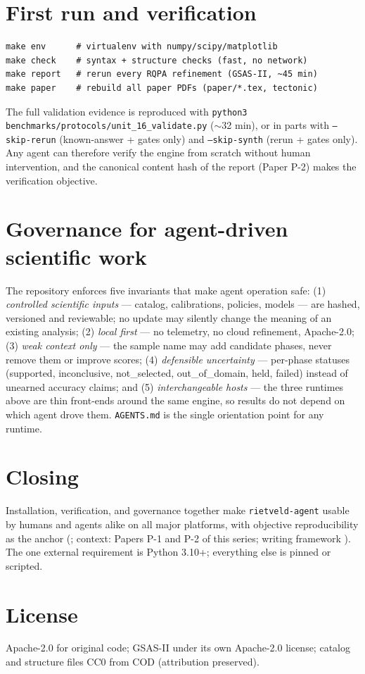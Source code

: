 \documentclass[11pt,a4paper]{article}
\begin{document}
\section{First run and verification}
\begin{verbatim}
make env      # virtualenv with numpy/scipy/matplotlib
make check    # syntax + structure checks (fast, no network)
make report   # rerun every RQPA refinement (GSAS-II, ~45 min)
make paper    # rebuild all paper PDFs (paper/*.tex, tectonic)
\end{verbatim}
The full validation evidence is reproduced with
\texttt{python3 benchmarks/protocols/}\allowbreak\texttt{unit\_16\_validate.py} ($\sim$32 min),
or in parts with \texttt{--skip-rerun} (known-answer + gates only) and
\texttt{--skip-synth} (rerun + gates only). Any agent can therefore
verify the engine from scratch without human intervention, and the
canonical content hash of the report (Paper P-2) makes the verification
objective.

\section{Governance for agent-driven scientific work}
The repository enforces five invariants that make agent operation safe:
(1) \emph{controlled scientific inputs} --- catalog, calibrations,
policies, models --- are hashed, versioned and reviewable; no update may
silently change the meaning of an existing analysis; (2) \emph{local
first} --- no telemetry, no cloud refinement, Apache-2.0; (3)
\emph{weak context only} --- the sample name may add candidate phases,
never remove them or improve scores; (4) \emph{defensible uncertainty} ---
per-phase statuses (supported, inconclusive, not\_selected,
out\_of\_domain, held, failed) instead of unearned accuracy claims; and
(5) \emph{interchangeable hosts} --- the three runtimes above are thin
front-ends around the same engine, so results do not depend on which
agent drove them. \texttt{AGENTS.md} is the single orientation point for
any runtime.

\section{Closing}
Installation, verification, and governance together make
\texttt{rietveld-agent} usable by humans and agents alike on all major
platforms, with objective reproducibility as the anchor
(\cite{rietveld-agent}; context: Papers P-1 and P-2 of this series;
writing framework \cite{drake2025fifteen}). The one external
requirement is Python 3.10+; everything else is pinned or scripted.

\section*{License}
Apache-2.0 for original code; GSAS-II under its own Apache-2.0 license;
catalog and structure files CC0 from COD (attribution preserved).



\end{document}
